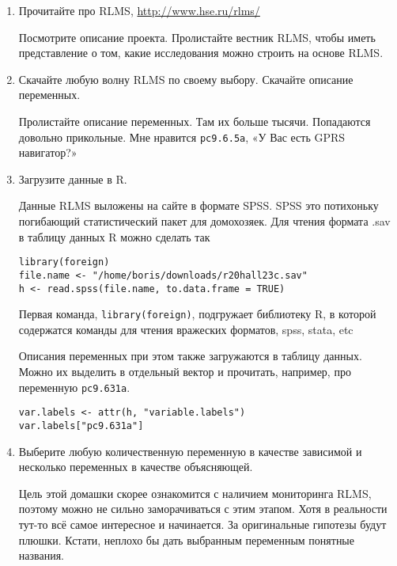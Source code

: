 \documentclass[12pt, a4paper]{article}
\theoremstyle{definition}
\begin{document}
\begin{enumerate}
\item Прочитайте про RLMS, \url{http://www.hse.ru/rlms/}

Посмотрите описание проекта. Пролистайте вестник RLMS, чтобы иметь представление о том, какие исследования можно строить на основе RLMS.

\item Скачайте любую волну RLMS по своему выбору. Скачайте описание переменных.

Пролистайте описание переменных. Там их больше тысячи. Попадаются довольно прикольные. Мне нравится \verb|pc9.6.5a|, «У Вас есть GPRS навигатор?»

\item Загрузите данные в R.

Данные RLMS выложены на сайте в формате SPSS. SPSS это потихоньку погибающий статистический пакет для домохозяек. Для чтения формата .sav в таблицу данных R можно сделать так
\begin{verbatim}
library(foreign)
file.name <- "/home/boris/downloads/r20hall23c.sav"
h <- read.spss(file.name, to.data.frame = TRUE)
\end{verbatim}

Первая команда, \verb|library(foreign)|, подгружает библиотеку R, в которой содержатся команды для чтения вражеских форматов, spss, stata, etc

Описания переменных при этом также загружаются в таблицу данных. Можно их выделить в отдельный вектор и прочитать, например, про переменную \verb|pc9.631a|.

\begin{verbatim}
var.labels <- attr(h, "variable.labels")
var.labels["pc9.631a"]
\end{verbatim}

\item Выберите любую количественную переменную в качестве зависимой и несколько переменных в качестве объясняющей.

Цель этой домашки скорее ознакомится с наличием мониторинга RLMS, поэтому можно не сильно заморачиваться с этим этапом. Хотя в реальности тут-то всё самое интересное и начинается. За оригинальные гипотезы будут плюшки. Кстати, неплохо бы дать выбранным переменным понятные названия.


\end{enumerate}
\end{document}
